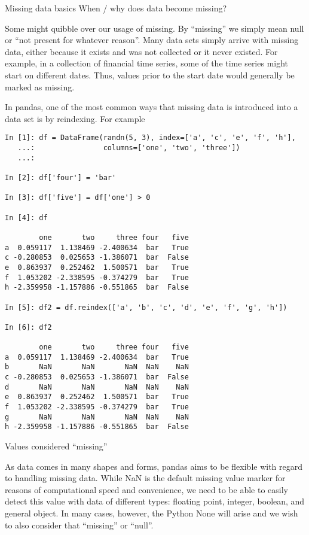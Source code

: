 \documentclass[11pt]{article} %
\begin{document}
\newpage
Missing data basics
When / why does data become missing?

Some might quibble over our usage of missing. By “missing” we simply mean null or “not present for whatever reason”. Many data sets simply arrive with missing data, either because it exists and was not collected or it never existed. For example, in a collection of financial time series, some of the time series might start on different dates. Thus, values prior to the start date would generally be marked as missing.

In pandas, one of the most common ways that missing data is introduced into a data set is by reindexing. For example

\begin{verbatim}
In [1]: df = DataFrame(randn(5, 3), index=['a', 'c', 'e', 'f', 'h'],
   ...:                columns=['one', 'two', 'three'])
   ...: 

In [2]: df['four'] = 'bar'

In [3]: df['five'] = df['one'] > 0

In [4]: df

        one       two     three four   five
a  0.059117  1.138469 -2.400634  bar   True
c -0.280853  0.025653 -1.386071  bar  False
e  0.863937  0.252462  1.500571  bar   True
f  1.053202 -2.338595 -0.374279  bar   True
h -2.359958 -1.157886 -0.551865  bar  False

In [5]: df2 = df.reindex(['a', 'b', 'c', 'd', 'e', 'f', 'g', 'h'])

In [6]: df2

        one       two     three four   five
a  0.059117  1.138469 -2.400634  bar   True
b       NaN       NaN       NaN  NaN    NaN
c -0.280853  0.025653 -1.386071  bar  False
d       NaN       NaN       NaN  NaN    NaN
e  0.863937  0.252462  1.500571  bar   True
f  1.053202 -2.338595 -0.374279  bar   True
g       NaN       NaN       NaN  NaN    NaN
h -2.359958 -1.157886 -0.551865  bar  False
\end{verbatim}
Values considered “missing”

As data comes in many shapes and forms, pandas aims to be flexible with regard to handling missing data. While NaN is the default missing value marker for reasons of computational speed and convenience, we need to be able to easily detect this value with data of different types: floating point, integer, boolean, and general object. In many cases, however, the Python None will arise and we wish to also consider that “missing” or “null”.
\end{document}
